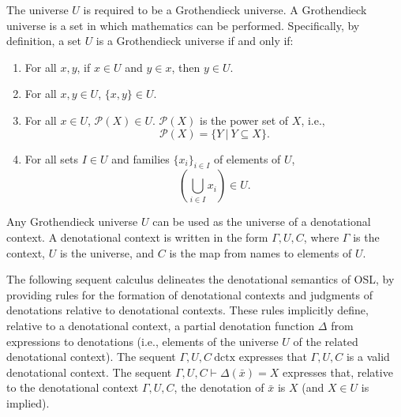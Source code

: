 \documentclass[11pt]{article}
\begin{document}
The universe $U$ is required to be a Grothendieck universe.
A Grothendieck universe is a set in which
mathematics can be performed. Specifically, by definition, a set $U$ is a Grothendieck
universe if and only if:
\begin{enumerate}
	\item For all $x, y$, if $x \in U$ and $y \in x$, then $y \in U$.
	\item For all $x, y \in U$, $\{x,y\} \in U$.
	\item For all $x \in U$, $\mathcal{P}(X) \in U$. $\mathcal{P}(X)$ is the power set of $X$, i.e.,
		\begin{equation}
			\mathcal{P}(X) = \{Y\ |\ Y \subseteq X\}.
		\end{equation}
	\item For all sets $I \in U$ and families $\{x_i\}_{i \in I}$ of
		elements of $U$,
		\begin{equation}
			\left(\bigcup_{i \in I} x_i \right) \in U.
		\end{equation}
\end{enumerate}
Any Grothendieck universe $U$ can be used as the universe of
a denotational context. A denotational context is written
in the form $\Gamma,U,C$, where $\Gamma$ is the context,
$U$ is the universe, and $C$ is the map from names to
elements of $U$.

The following sequent calculus delineates the denotational semantics
of OSL, by providing rules for the formation of denotational
contexts and judgments of denotations relative to denotational
contexts. These rules implicitly define, relative to a
denotational context, a partial denotation
function $\Delta$ from expressions to denotations (i.e.,
elements of the universe $U$ of the related denotational
context). The sequent $\Gamma,U,C\ \text{dctx}$ expresses
that $\Gamma,U,C$ is a valid denotational context.
The sequent $\Gamma,U,C \vdash \Delta(\bar{x}) = X$
expresses that, relative to the denotational context
$\Gamma,U,C$, the denotation of $\bar{x}$ is $X$
(and $X \in U$ is implied).
\end{document}
